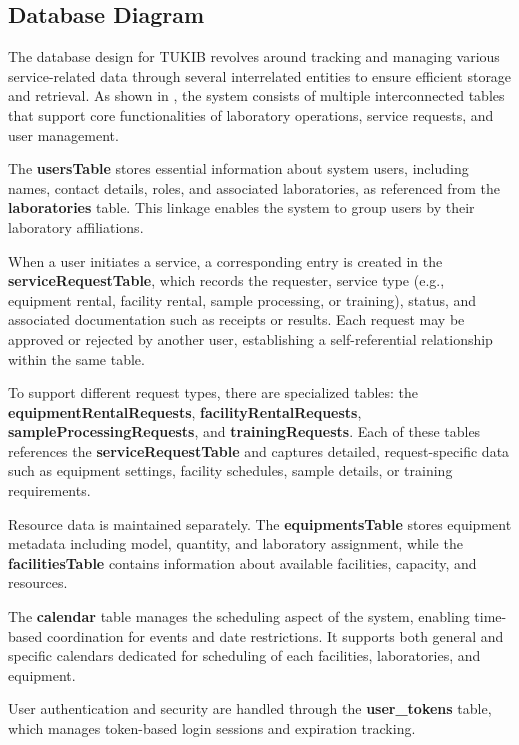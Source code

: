 \newpage

\subsection{Database Diagram}

The database design for TUKIB revolves around tracking and managing various service-related data through several interrelated entities to ensure efficient storage and retrieval. As shown in , the system consists of multiple interconnected tables that support core functionalities of laboratory operations, service requests, and user management.

The \textbf{usersTable} stores essential information about system users, including names, contact details, roles, and associated laboratories, as referenced from the \textbf{laboratories} table. This linkage enables the system to group users by their laboratory affiliations.

When a user initiates a service, a corresponding entry is created in the \textbf{serviceRequestTable}, which records the requester, service type (e.g., equipment rental, facility rental, sample processing, or training), status, and associated documentation such as receipts or results. Each request may be approved or rejected by another user, establishing a self-referential relationship within the same table.

To support different request types, there are specialized tables: the \textbf{equipmentRentalRequests}, \textbf{facilityRentalRequests}, \textbf{sampleProcessingRequests}, and \textbf{trainingRequests}. Each of these tables references the \textbf{serviceRequestTable} and captures detailed, request-specific data such as equipment settings, facility schedules, sample details, or training requirements.

Resource data is maintained separately. The \textbf{equipmentsTable} stores equipment metadata including model, quantity, and laboratory assignment, while the \textbf{facilitiesTable} contains information about available facilities, capacity, and resources. 

The \textbf{calendar} table manages the scheduling aspect of the system, enabling time-based coordination for events and date restrictions. It supports both general and specific calendars dedicated for scheduling of each facilities, laboratories, and equipment.

User authentication and security are handled through the \textbf{user\_tokens} table, which manages token-based login sessions and expiration tracking.

